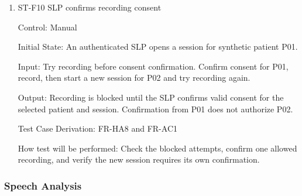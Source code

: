 \documentclass[12pt, titlepage]{article}
\begin{document}
\begin{enumerate}
\item{ST-F10 SLP confirms recording consent\\}

Control: Manual

Initial State: An authenticated SLP opens a session for synthetic patient P01.

Input: Try recording before consent confirmation. Confirm consent for P01, record, then start a new session for P02 and try recording again.

Output: Recording is blocked until the SLP confirms valid consent for the selected patient and session. Confirmation from P01 does not authorize P02.

Test Case Derivation: FR-HA8 and FR-AC1

How test will be performed: Check the blocked attempts, confirm one allowed recording, and verify the new session requires its own confirmation.

\end{enumerate}

\subsubsection{Speech Analysis}
\end{document}
